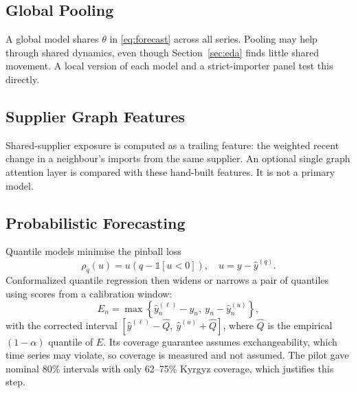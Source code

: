 \documentclass[conference]{IEEEtran}
\newcommand{\ind}{\mathbb{1}}
\begin{document}
\subsection{Global Pooling}\label{sec:global}
A global model shares $\theta$ in \eqref{eq:forecast} across all series. Pooling may help through shared dynamics, even though Section~\ref{sec:eda} finds little shared movement. A local version of each model and a strict-importer panel test this directly.

\subsection{Supplier Graph Features}
Shared-supplier exposure is computed as a trailing feature: the weighted recent change in a neighbour's imports from the same supplier. An optional single graph attention layer \cite{velickovic2018} is compared with these hand-built features. It is not a primary model.

\subsection{Probabilistic Forecasting}\label{sec:uq}
Quantile models minimise the pinball loss
\begin{equation}
\rho_q(u)=u\left(q-\ind[u<0]\right),\quad u=y-\hat{y}^{(q)}.
\label{eq:pinball}
\end{equation}
Conformalized quantile regression \cite{romano2019} then widens or narrows a pair of quantiles using scores from a calibration window:
\begin{equation}
E_n=\max\!\left\{\hat{y}^{(\ell)}_n-y_n,\ y_n-\hat{y}^{(u)}_n\right\},
\label{eq:cqr}
\end{equation}
with the corrected interval $[\hat{y}^{(\ell)}-\hat{Q},\ \hat{y}^{(u)}+\hat{Q}]$, where $\hat{Q}$ is the empirical $(1-\alpha)$ quantile of $E$. Its coverage guarantee assumes exchangeability, which time series may violate, so coverage is measured and not assumed. The pilot gave nominal 80\% intervals with only 62--75\% Kyrgyz coverage, which justifies this step.
\end{document}
